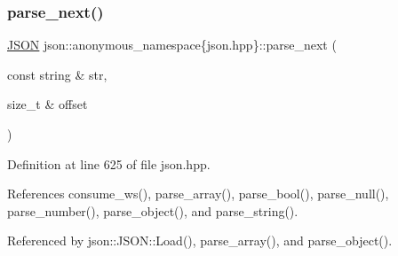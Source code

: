 \subsubsection{\texorpdfstring{parse\+\_\+next()}{parse\_next()}}
{\footnotesize\ttfamily \mbox{\hyperlink{classjson_1_1_j_s_o_n}{J\+S\+ON}} json\+::anonymous\+\_\+namespace\{json.\+hpp\}\+::parse\+\_\+next (\begin{DoxyParamCaption}\item[{const string \&}]{str,  }\item[{size\+\_\+t \&}]{offset }\end{DoxyParamCaption})}



Definition at line 625 of file json.\+hpp.



References consume\+\_\+ws(), parse\+\_\+array(), parse\+\_\+bool(), parse\+\_\+null(), parse\+\_\+number(), parse\+\_\+object(), and parse\+\_\+string().



Referenced by json\+::\+J\+S\+O\+N\+::\+Load(), parse\+\_\+array(), and parse\+\_\+object().


